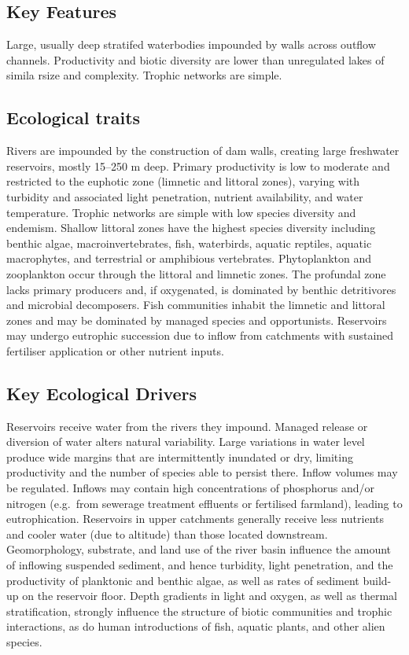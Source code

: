 \documentclass[
  letterpaper,
  DIV=11,
  numbers=noendperiod]{scrartcl}
\begin{document}
\subsection{Key Features}\label{key-features-126}

Large, usually deep stratifed waterbodies impounded by walls across
outflow channels. Productivity and biotic diversity are lower than
unregulated lakes of simila rsize and complexity. Trophic networks are
simple.

\subsection{Ecological traits}\label{ecological-traits-126}

Rivers are impounded by the construction of dam walls, creating large
freshwater reservoirs, mostly 15--250 m deep. Primary productivity is
low to moderate and restricted to the euphotic zone (limnetic and
littoral zones), varying with turbidity and associated light
penetration, nutrient availability, and water temperature. Trophic
networks are simple with low species diversity and endemism. Shallow
littoral zones have the highest species diversity including benthic
algae, macroinvertebrates, fish, waterbirds, aquatic reptiles, aquatic
macrophytes, and terrestrial or amphibious vertebrates. Phytoplankton
and zooplankton occur through the littoral and limnetic zones. The
profundal zone lacks primary producers and, if oxygenated, is dominated
by benthic detritivores and microbial decomposers. Fish communities
inhabit the limnetic and littoral zones and may be dominated by managed
species and opportunists. Reservoirs may undergo eutrophic succession
due to inflow from catchments with sustained fertiliser application or
other nutrient inputs.

\subsection{Key Ecological Drivers}\label{key-ecological-drivers-126}

Reservoirs receive water from the rivers they impound. Managed release
or diversion of water alters natural variability. Large variations in
water level produce wide margins that are intermittently inundated or
dry, limiting productivity and the number of species able to persist
there. Inflow volumes may be regulated. Inflows may contain high
concentrations of phosphorus and/or nitrogen (e.g.~from sewerage
treatment effluents or fertilised farmland), leading to eutrophication.
Reservoirs in upper catchments generally receive less nutrients and
cooler water (due to altitude) than those located downstream.
Geomorphology, substrate, and land use of the river basin influence the
amount of inflowing suspended sediment, and hence turbidity, light
penetration, and the productivity of planktonic and benthic algae, as
well as rates of sediment build-up on the reservoir floor. Depth
gradients in light and oxygen, as well as thermal stratification,
strongly influence the structure of biotic communities and trophic
interactions, as do human introductions of fish, aquatic plants, and
other alien species.
\end{document}
